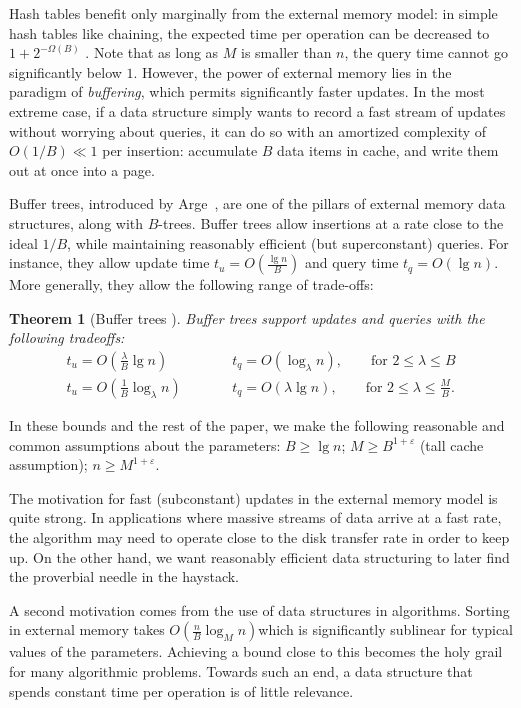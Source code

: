 \documentclass[letterpaper,11pt]{article}
\newtheorem{theorem}{Theorem}
\newcommand{\eps}{\varepsilon}
\begin{document}
Hash tables benefit only marginally from the external memory model: in
simple hash tables like chaining, the expected time per operation can
be decreased to $1 + 2^{-\Omega(B)}$ \cite{knuth-vol3}. Note that as
long as $M$ is smaller than $n$, the query time cannot go
significantly below $1$. However, the power of external memory lies in
the paradigm of \emph{buffering}, which permits significantly faster
updates.  In the most extreme case, if a data structure simply wants
to record a fast stream of updates without worrying about queries, it can do so with an amortized
complexity of $O(1/B) \ll 1$ per insertion: accumulate $B$ data items
in cache, and write them out at once into a page.

Buffer trees, introduced by Arge~\cite{arge03buffer}, are one of the
pillars of external memory data structures, along with
$B$-trees. Buffer trees allow insertions at a rate close to the ideal
$1/B$, while maintaining reasonably efficient (but superconstant)
queries. For instance, they allow update time $t_u = O(\frac{\lg
  n}{B})$ and query time $t_q = O(\lg n)$. More generally, they allow
the following range of trade-offs:

\begin{theorem}[Buffer trees \cite{arge03buffer}]\label{buffer}
Buffer trees support updates and queries with the following tradeoffs:
\begin{eqnarray}
t_u = O(\tfrac{\lambda}{B} \lg n) &\qquad&
  t_q = O(\log_\lambda n), \qquad \textrm{for } 2 \le \lambda \le B 
\label{eq:buff-low}  \\
t_u = O(\tfrac{1}{B} \log_\lambda n) & &
  t_q = O(\lambda \lg n), \qquad \textrm{for } 2 \le \lambda \le
  \tfrac{M}{B}.  \label{eq:buff-hi}
\end{eqnarray}
\end{theorem}

In these bounds and the rest of the paper, we make the following
reasonable and common assumptions about the parameters: $B \ge \lg n$; 
$M \ge B^{1+\eps}$ (tall cache assumption); $n \ge M^{1+\eps}$.

The motivation for fast (subconstant) updates in the external memory model
is quite strong. In applications where massive streams of data arrive
at a fast rate, the algorithm may need to operate close to the disk
transfer rate in order to keep up. On the other hand, we want reasonably
efficient data structuring to later find the proverbial needle in the
haystack.

A second motivation comes from the use of data structures in
algorithms. Sorting in external memory takes $O(\frac{n}{B} \log_M
n)$which is significantly sublinear for typical values of the parameters.
Achieving a bound close to this becomes the holy grail for many
algorithmic problems. Towards such an end, a data structure that
spends constant time per operation is of little relevance.
\end{document}
